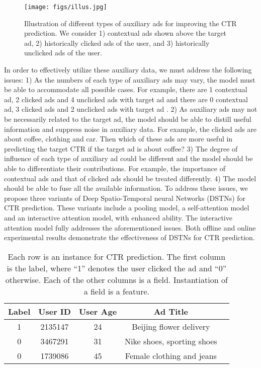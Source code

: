 \documentclass[sigconf]{acmart}
\begin{document}
\begin{figure}[!t]
\centering
\texttt{[image: figs/illus.jpg]}
\vskip -8pt
\caption{Illustration of different types of auxiliary ads for improving the CTR prediction. We consider 1) contextual ads shown above the target ad, 2) historically clicked ads of the user, and 3) historically unclicked ads of the user.}
\vskip -5pt
\label{illus}
\end{figure}

In order to effectively utilize these auxiliary data, we must address the following issues: 1) As the numbers of each type of auxiliary ads may vary, the model must be able to accommodate all possible cases. For example, there are 1 contextual ad, 2 clicked ads and 4 unclicked ads with target ad  and there are 0 contextual ad, 3 clicked ads and 2 unclicked ads with target ad . 2) As auxiliary ads may not be necessarily related to the target ad, the model should be able to distill useful information and suppress noise in auxiliary data. For example, the clicked ads are about coffee, clothing and car. Then which of these ads are more useful in predicting the target CTR if the target ad is about coffee? 3) The degree of influence of each type of auxiliary ad could be different and the model should be able to differentiate their contributions. For example, the importance of contextual ads and that of clicked ads should be treated differently. 4) The model should be able to fuse all the available information.
To address these issues, we propose three variants of Deep Spatio-Temporal neural Networks (DSTNs) for CTR prediction. These variants include a pooling model, a self-attention model and an interactive attention model, with enhanced ability. The interactive attention model fully addresses the aforementioned issues. Both offline and online experimental results demonstrate the effectiveness of DSTNs for CTR prediction.

\begin{table}[!t]
\caption{Each row is an instance for CTR prediction. The first column is the label, where ``1'' denotes the user clicked the ad and ``0'' otherwise. Each of the other columns is a field. Instantiation of a field is a feature.}
\vskip -8pt
\label{tab_ft}
\centering
\begin{tabular}{|c|c|c|c|c|}
\hline
\textbf{Label} & \textbf{User ID} & \textbf{User Age} & \textbf{Ad Title} \\
\hline
1 & 2135147 & 24 & Beijing flower delivery \\
\hline
0 & 3467291 & 31 & Nike shoes, sporting shoes \\
\hline
0 & 1739086 & 45 & Female clothing and jeans \\
\hline
\end{tabular}
\vskip -8pt
\end{table}
\end{document}
